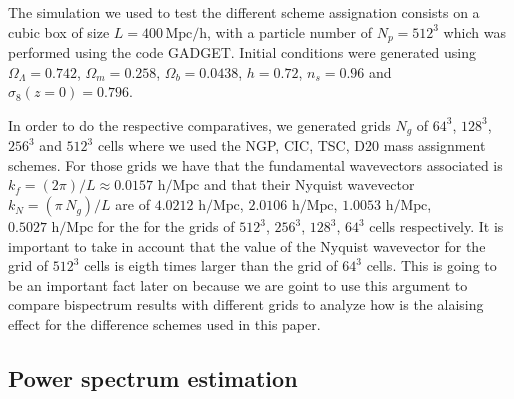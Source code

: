 \documentclass[a4paper,fleqn,usenatbib]{mnras}
\begin{document}
The simulation we used to test the different scheme assignation consists on a  
cubic box of size $L=400\,\text{Mpc/h}$, with a particle number of $N_p=512^3$ 
which was performed using the code GADGET. Initial conditions were 
generated using $\Omega_\Lambda=0.742$, $\Omega_m=0.258$, $\Omega_b=0.0438$, 
$h=0.72$, $n_s=0.96$ and $\sigma_8(z=0)=0.796$.

In order to do the respective comparatives, we generated grids $N_g$ of $64^3$, 
$128^3$, $256^3$ and $512^3$ cells where we used the NGP, CIC, TSC, D20 mass 
assignment schemes. For those grids we have that the fundamental wavevectors 
associated is $k_f=(2\pi)/L \approx 0.0157 \text{ h/Mpc}$ and that their Nyquist 
wavevector $k_N=(\pi\,N_g)/L$ are of $4.0212\text{ h/Mpc}$, 
$2.0106\text{ h/Mpc}$, $1.0053\text{ h/Mpc}$, $0.5027\text{ h/Mpc}$ for the for 
the grids of $512^3$, $256^3$, $128^3$, $64^3$ cells respectively. It is 
important to take in account that the value of the Nyquist wavevector for the 
grid of $512^3$ cells is eigth times larger than the grid of $64^3$ cells. This 
is going to be an important fact later on because we are goint to use this 
argument to compare bispectrum results with different grids to analyze how is 
the alaising effect for the difference schemes used in this paper.


\subsection{Power spectrum estimation}
\label{sec:methods:pk}
\end{document}
